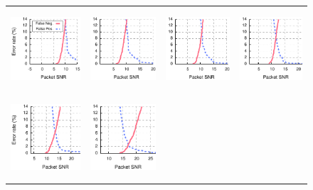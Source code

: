 \begin{figure}[p]
	\begin{leftfullpage}
	\centering
	
	\begin{tabular}{cccc}
	\includegraphics[height=1.2in]{figures/delivery/goodbad/packet_snr_goodbad_0.pdf} &
	\includegraphics[height=1.2in]{figures/delivery/goodbad/packet_snr_goodbad_1.pdf} &
	\includegraphics[height=1.2in]{figures/delivery/goodbad/packet_snr_goodbad_2.pdf} &
	\includegraphics[height=1.2in]{figures/delivery/goodbad/packet_snr_goodbad_3.pdf} \\
	\includegraphics[height=1.2in]{figures/delivery/goodbad/packet_snr_goodbad_4.pdf} &
	\includegraphics[height=1.2in]{figures/delivery/goodbad/packet_snr_goodbad_5.pdf} &

\end{tabular}
\end{leftfullpage}
\end{figure}
